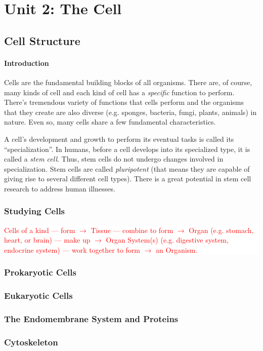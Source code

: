 \documentclass[12pt]{article}
\newcommand{\ctext}[3]{
    \colorbox{#2}{\parbox{0.9\textwidth}{\textcolor{#1}{#3}}}
}
\begin{document}
\section{Unit 2: The Cell}
\subsection{Cell Structure}
\paragraph{Introduction}
Cells are the fundamental building blocks of all organisms. There are, of course, many kinds of cell and each kind of cell has a \emph{specific} function to perform. There's tremendous variety of functions that cells perform and the organisms that they create are also diverse (e.g. sponges, bacteria, fungi, plants, animals) in nature. Even so, many cells share a few fundamental characteristics.

A cell's development and growth to perform its eventual tasks is called its ``specialization''. In humans, before a cell develops into its specialized type, it is called a \emph{stem cell}. Thus, stem cells do not undergo changes involved in specialization. Stem cells are called \emph{pluripotent} (that means they are capable of giving rise to several different cell types). There is a great potential in stem cell research to address human illnesses.
\subsubsection{Studying Cells}
\ctext{red}{white}{
    Cells of a kind --- form $\rightarrow$ Tissue --- combine to form $\rightarrow$ Organ (e.g. stomach, heart, or brain) --- make up $\rightarrow$ Organ System(s) (e.g. digestive system, endocrine system) --- work together to form $\rightarrow$ an Organism.
}
\subsubsection{Prokaryotic Cells}
\subsubsection{Eukaryotic Cells}
\subsubsection{The Endomembrane System and Proteins}
\subsubsection{Cytoskeleton}
\end{document}

